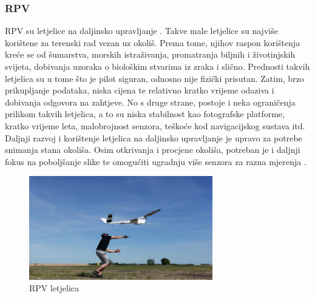 \documentclass[times, utf8, diplomski]{fer}
\begin{document}
\subsubsection{RPV}
RPV su letjelice na daljinsko upravljanje . Takve male letjelice  su  najviše  korištene  za  terenski  rad  vezan  uz  okoliš. Prema  tome,  njihov  raspon korištenja kreće se od šumarstva, morskih istraživanja, promatranja biljnih i životinjskih svijeta, dobivanja uzoraka o biološkim stvarima iz zraka i slično. Prednosti takvih letjelica su u tome što je pilot siguran, odnosno nije fizički prisutan. Zatim, brzo prikupljanje podataka, niska cijena te relativno kratko vrijeme odaziva i dobivanja odgovora na zahtjeve. No s druge strane, postoje i neka ograničenja prilikom takvih letjelica, a to su niska stabilnost kao fotografske platforme, kratko vrijeme leta, malobrojnost senzora, teškoće kod navigacijskog sustava itd. \\
Daljnji razvoj i korištenje letjelica na daljinsko upravljanje je upravo za potrebe snimanja stana okoliša. Osim otkrivanja i procjene okoliša, potreban je i daljnji fokus na poboljšanje slike te omogućiti ugradnju više senzora za razna mjerenja \citep{Hardin}.
\begin{figure}[htb]
\centering
\includegraphics[width=8cm]{img/RPV.png}
\caption{RPV letjelica\protect\footnotemark}
\label{fig:RPV letjelica}
\end{figure}
\end{document}
